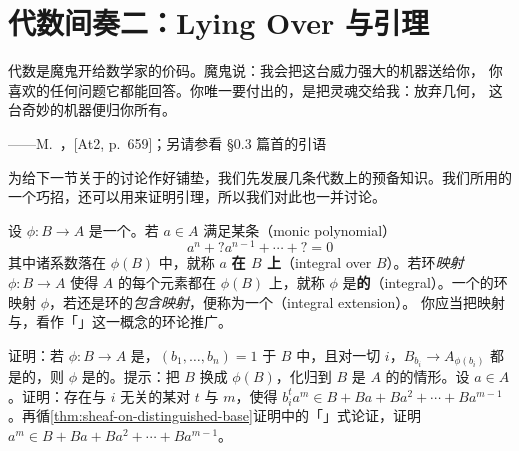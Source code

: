 
\section{代数间奏二：Lying Over 与\trNakayama{}引理}

\epigraph
  {代数是魔鬼开给数学家的价码。魔鬼说：我会把这台威力强大的机器送给你，
   你喜欢的任何问题它都能回答。你唯一要付出的，是把灵魂交给我：放弃几何，
   这台奇妙的机器便归你所有。}
  {——M.~\trAtiyah，[At2, p.~659]；另请参看 \S0.3 篇首的\trAtiyah{}引语}

为给下一节关于\trIntegral\trMorphism{}的讨论作好铺垫，我们先发展几条代数上的预备知识。我们所用的一个巧招，还可以用来证明\trNakayama{}引理，所以我们对此也一并讨论。

设 $\phi\colon B\to A$ 是一个\trRingMorphism。若 $a\in A$ 满足某条\trMonicPolynomial{}（monic polynomial）%
\[
a^n+?a^{n-1}+\cdots+?=0
\]
其中诸系数落在 $\phi(B)$ 中，就称 $a$ \textbf{在 $B$ 上\trIntegral}（integral over $B$）。若环\emph{映射} $\phi\colon B\to A$ 使得 $A$ 的每个元素都在 $\phi(B)$ 上\trIntegral，就称 $\phi$ 是\textbf{\trIntegral{}的}（integral）。一个\trIntegral{}的环映射 $\phi$，若还是环的\emph{包含映射}，便称为一个\textbf{\trIntegralExtension{}}（integral extension）。%
你应当把\trIntegral{}映射与\trIntegralExtension{}，看作「\trAlgebraic\trFieldExtension」这一概念的环论推广。

\begin{exercise}\label{ex:integrality-affine-cover}
证明：若 $\phi\colon B\to A$ 是\trRingMorphism{}，$(b_1,\dots,b_n)=1$ 于 $B$ 中，且对一切 $i$，$B_{b_i}\to A_{\phi(b_i)}$ 都是\trIntegral{}的，则 $\phi$ 是\trIntegral{}的。提示：把 $B$ 换成 $\phi(B)$，化归到 $B$ 是 $A$ 的\trSubring{}的情形。设 $a\in A$。证明：存在与 $i$ 无关的某对 $t$ 与 $m$，使得 $b_i^t a^m\in B+Ba+Ba^2+\cdots+Ba^{m-1}$。再循\cref{thm:sheaf-on-distinguished-base}证明中的「\trPartitionOfUnity」式论证，证明 $a^m\in B+Ba+Ba^2+\cdots+Ba^{m-1}$。
\end{exercise}

